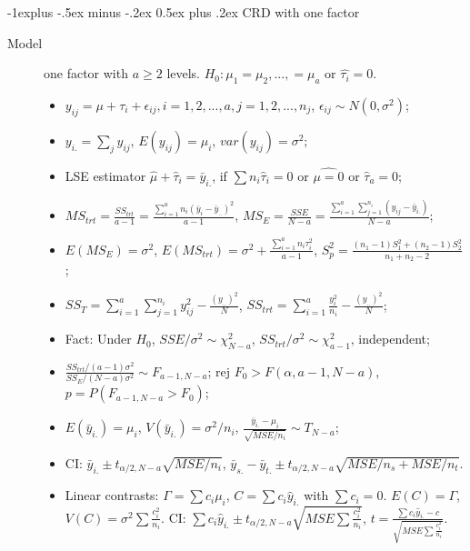 \documentclass[10pt,landscape]{article}
\makeatletter
\renewcommand{\subsection}{\@startsection{subsection}{2}{0mm}%
                                {-1explus -.5ex minus -.2ex}%
                                {0.5ex plus .2ex}%
                                {\normalfont\normalsize\bfseries}}
\makeatother
\begin{document}
\begin{multicols}{3}
\subsection{CRD with one factor}
\begin{description}
    \item[Model] one factor with $a\geq 2$ levels. $H_0: \mu_1 = \mu_2, ..., = \mu_a$ or $\hat{\tau_i} = 0$.
    \begin{itemize}
         \item $y_{ij} = \mu + \tau_i + \epsilon_{ij}, i=1,2,...,a, j=1,2,...,n_j$, $\epsilon_{ij}\sim N(0,\sigma^2)$;
         \item $y_{i.} = \sum_j y_{ij}$, $E(y_{ij}) = \mu_i$, $var(y_{ij}) = \sigma^2$;
    		\item LSE estimator $\hat{\mu} + \hat{\tau}_i = \bar{y}_{i.}$,  if $\sum n_i\hat{\tau}_i = 0$ or $\hat{\mu = 0}$ or $\hat{\tau}_a=0$;
    		\item $MS_{trt} = \frac{SS_{trt}}{a-1} =\frac{\sum_{i=1}^a n_i (\bar{y}_i - \bar{y}_{..})^2}{a-1}$, $MS_E = \frac{SSE}{N-a} = \frac{\sum_{i=1}^a \sum_{j=1}^{n_i} (y_{ij} - \bar{y}_{i.})}{N-a}$;
    		\item $E(MS_E)=\sigma^2$, $E(MS_{trt}) = \sigma^2 + \frac{\sum_{i=1}^a n_i \tau_i^2}{a-1}$, $S_p^2 = \frac{(n_1-1)S_1^2 + (n_2-1)S_2^2}{n_1+n_2-2}$;
    		\item $SS_T = \sum_{i=1}^a \sum_{j=1}^{n_i} y_{ij}^2 - \frac{(y_{..})^2}{N}$, $SS_{trt} = \sum_{i=1}^a \frac{y_i^2}{n_i} - \frac{(y_{..})^2}{N}$;
    		\item Fact: Under $H_0$, $SSE/\sigma^2 \sim \chi_{N-a}^2$, $SS_{trt}/\sigma^2 \sim \chi_{a-1}^2$, independent;
    		\item $\frac{SS_{trt}/(a-1)\sigma^2}{SS_{E}/(N-a)\sigma^2} \sim F_{a-1, N-a}$; rej  $F_0 > F(\alpha, a-1, N-a)$,  $p = P(F_{a-1, N-a} > F_0)$;
    		\item $E(\bar{y}_{i.}) = \mu_i$, $V(\bar{y}_{i.})=\sigma^2/n_i$, $\frac{\bar{y}_{i.} - \mu_i}{\sqrt{MSE/n_i}}\sim T_{N-a}$;
    		\item CI: $\bar{y}_{i.} \pm t_{\alpha /2, N-a}\sqrt{MSE/n_i}$, $\bar{y}_{s.} - \bar{y}_{t.} \pm t_{\alpha /2, N-a}\sqrt{MSE/n_s+MSE/n_t}$.
    		\item Linear contrasts: $\Gamma = \sum c_i\mu_i$, $C = \sum c_i\hat{y}_{i.}$ with $\sum c_i = 0$. $E(C)=\Gamma$, $V(C) = \sigma^2\sum \frac{c_i^2}{n_i}$. CI: $\sum c_i\hat{y}_{i.} \pm t_{\alpha /2, N-a}\sqrt{MSE\sum \frac{c_i^2}{n_i}}$, $t=\frac{\sum c_i\hat{y}_{i.} - c}{\sqrt{MSE\sum \frac{c_i^2}{n_i}}}$.
    \end{itemize}
    \end{description}
    

\end{multicols}
\end{document}
